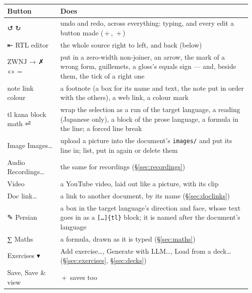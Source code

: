 \documentclass[11pt,oneside]{report}
\newcommand{\sym}[1]{{\symfont #1}}
\newcommand{\file}[1]{\texttt{#1}}
\newcommand{\key}[1]{\textsf{\small\fbox{#1}}}
\newcommand{\menu}[1]{\textsf{#1}}
\begin{document}
\begin{center}
\small
\begin{longtable}{@{}>{\raggedright\arraybackslash}p{}>{\raggedright\arraybackslash}p{}@{}}
\toprule
\textsf{Button} & \textsf{Does} \\
\midrule
\menu{\sym{↺}} \menu{\sym{↻}} & undo and redo, across everything: typing,
  and every edit a button made (\key{Ctrl}\,+\,\key{Z}, \key{Ctrl}\,+\,\key{Y}) \\
\addlinespace
\menu{\sym{⇤} RTL editor} & the whole source right to left, and back
  (below) \\
\addlinespace
\menu{ZWNJ} \menu{\sym{→}} \menu{\sym{✗}} \menu{\sym{«»}} \menu{=} & put in a
  zero-width non-joiner, an arrow, the mark of a wrong form, guillemets, a
  gloss's equals sign --- and, beside them, the tick of a right one \\
\addlinespace
\menu{note} \menu{link} \menu{colour} & a footnote (a box for its name and
  text, the note put in order with the others), a web link, a colour mark \\
\addlinespace
\menu{tl} \menu{kana} \menu{block} \menu{math} \menu{\sym{⏎}} & wrap the
  selection as a run of the target language, a reading (Japanese only), a
  block of the prose language, a formula in the line; a forced line break \\
\addlinespace
\menu{Image} \menu{Images\ldots} & upload a picture into the document's
  \file{images/} and put its line in; list, put in again or delete them \\
\addlinespace
\menu{Audio} \menu{Recordings\ldots} & the same for recordings
  (\S\ref{sec:recordings}) \\
\addlinespace
\menu{Video} & a YouTube video, laid out like a picture, with its clip \\
\addlinespace
\menu{Doc link\ldots} & a link to another document, by its name
  (\S\ref{sec:doclinks}) \\
\addlinespace
\menu{\sym{✎} Persian} & a box in the target language's direction and face,
  whose text goes in as a \texttt{[\ldots]\{tl\}} block; it is named after the
  document's language \\
\addlinespace
\menu{\sym{∑} Maths} & a formula, drawn as it is typed (\S\ref{sec:maths}) \\
\addlinespace
\menu{Exercises \sym{▾}} & \menu{Add exercise\ldots}, \menu{Generate with
  LLM\ldots}, \menu{Load from a deck\ldots} (\S\ref{sec:exercises},
  \S\ref{sec:decks}) \\*
\addlinespace
\menu{Save}, \menu{Save \& view} & \key{Ctrl}\,+\,\key{S} saves too \\
\bottomrule
\end{longtable}
\end{center}
\end{document}
